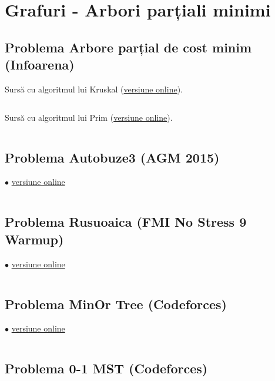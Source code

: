 \documentclass[../main.tex]{subfiles}
\begin{document}
\chapter{Grafuri - Arbori parțiali minimi}

\section{Problema Arbore parțial de cost minim (Infoarena)}
\label{code:apm}

Sursă cu algoritmul lui Kruskal (\href{https://www.infoarena.ro/job_detail/3275082?action=view-source}{versiune online}).

\inputminted{cpp}{../src/graphs/mst-kruskal.cpp}

Sursă cu algoritmul lui Prim (\href{https://www.infoarena.ro/job_detail/3275119?action=view-source}{versiune online}).

\inputminted{cpp}{../src/graphs/mst-prim.cpp}

\section{Problema Autobuze3 (AGM 2015)}
\label{code:autobuze3}
$\bullet$
\href{https://infoarena.ro/job_detail/3275328?action=view-source}{versiune online}

\inputminted{cpp}{../src/graphs/autobuze3.cpp}

\section{Problema Rusuoaica (FMI No Stress 9 Warmup)}
\label{code:rusuoaica}
$\bullet$
\href{https://infoarena.ro/job_detail/3193056?action=view-source}{versiune online}

\inputminted{cpp}{../src/graphs/rusuoaica.cpp}

\section{Problema MinOr Tree (Codeforces)}
\label{code:minor-tree}
$\bullet$
\href{https://codeforces.com/contest/1624/submission/241333322}{versiune online}

\inputminted{cpp}{../src/graphs/minor-tree.cpp}

\section{Problema 0-1 MST (Codeforces)}
\label{code:0-1-mst}
\end{document}
